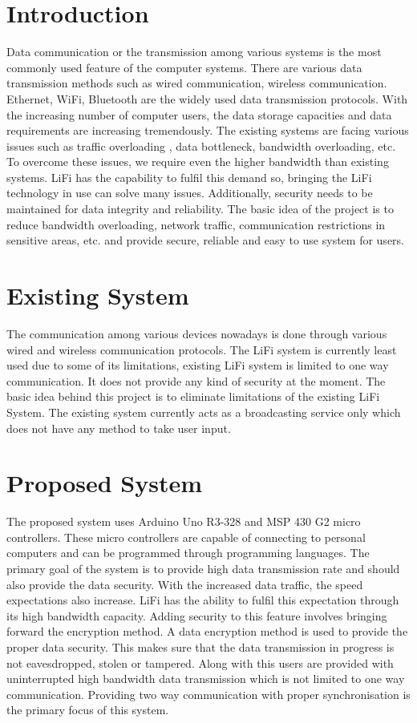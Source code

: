 \documentclass{ijcaArticle}
\begin{document}
\section{Introduction}

Data communication or the transmission among various systems is the most commonly used feature
of the computer systems. There are various data transmission methods such as wired communication,
wireless communication. Ethernet, WiFi, Bluetooth are the widely used data transmission protocols.
With the increasing number of computer users, the data storage capacities and data requirements are
increasing tremendously. The existing systems are facing various issues such as traffic overloading
, data bottleneck, bandwidth overloading, etc. To overcome these issues, we require even the higher
bandwidth than existing systems. LiFi has the capability to fulfil this demand so, bringing the LiFi
technology in use can solve many issues. Additionally, security needs to be maintained for data integrity
and reliability. The basic idea of the project is to reduce bandwidth overloading, network traffic,
communication restrictions in sensitive areas, etc. and provide secure, reliable and easy to use system
for users.



\section{Existing System}
\label{sec:documentclass}
The communication among various devices nowadays is done through various wired and wireless communication protocols. The LiFi system is currently least used due to some of its limitations, existing LiFi system is limited to one  way communication. It does not provide any kind of security at the moment. The basic idea behind this project is to eliminate limitations of the existing LiFi System. The existing system currently acts as a broadcasting service only which does not have any method to take user input.
\section{Proposed System}

The proposed system uses Arduino Uno R3-328 and MSP 430 G2 micro controllers. These micro
controllers are capable of connecting to personal computers and can be programmed through programming
languages. The primary goal of the system is to provide high data transmission rate and
should also provide the data security. With the increased data traffic, the speed expectations
also increase. LiFi has the ability to fulfil this expectation through its high bandwidth capacity.
Adding security to this feature involves bringing forward the encryption method. A data encryption method is used to provide the proper data security. This makes sure that the data transmission in progress is not eavesdropped, stolen or tampered. Along with this users are provided with uninterrupted high bandwidth data transmission which is not limited to one way communication. Providing two way communication with proper synchronisation is the primary focus of this system.
\end{document}
